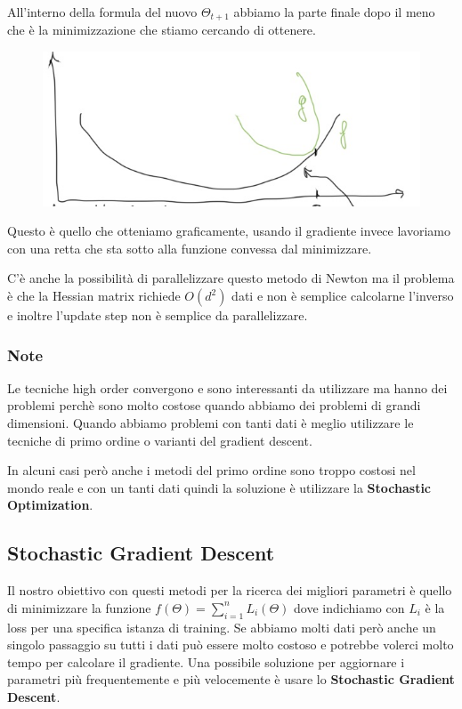 \documentclass[14pt]{extreport}
\begin{document}
All'interno della formula del nuovo $\Theta_{t+1}$ abbiamo la parte finale dopo il meno che è la minimizzazione che stiamo cercando di ottenere.
\begin{figure}[H]
\centering
\includegraphics[width=0.7\linewidth]{258.jpeg}
\end{figure}

Questo è quello che otteniamo graficamente, usando il gradiente invece lavoriamo con una retta che sta sotto alla funzione convessa dal minimizzare.

C'è anche la possibilità di parallelizzare questo metodo di Newton ma il problema è che la Hessian matrix richiede $O(d^2)$ dati e non è semplice
calcolarne l'inverso e inoltre l'update step non è semplice da parallelizzare.

\subsubsection{Note}

Le tecniche high order convergono e sono interessanti da utilizzare ma hanno dei problemi perchè sono molto costose quando abbiamo dei problemi di
grandi dimensioni. Quando abbiamo problemi con tanti dati è meglio utilizzare le tecniche di primo ordine o varianti del gradient descent.

In alcuni casi però anche i metodi del primo ordine sono troppo costosi nel mondo reale e con un tanti dati quindi la soluzione è utilizzare la
\textbf{Stochastic Optimization}.

\subsection{Stochastic Gradient Descent}

Il nostro obiettivo con questi metodi per la ricerca dei migliori parametri è quello di minimizzare la funzione $f(\Theta) = \sum_{i=1}^n L_i(\Theta)$
dove indichiamo con $L_i$ è la loss per una specifica istanza di training. Se abbiamo molti dati però anche un singolo passaggio su tutti i dati può
essere molto costoso e potrebbe volerci molto tempo per calcolare il gradiente. Una possibile soluzione per aggiornare i parametri più frequentemente
e più velocemente è usare lo \textbf{Stochastic Gradient Descent}.
\end{document}
